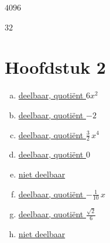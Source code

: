 \documentclass{ximera}
\begin{document}
\begin{Antwoord} \label{antw1.17}
\hyperlink{oef1.17}{$4096$}
\end{Antwoord}

\begin{Antwoord} \label{antw1.18}
\hyperlink{oef1.18}{$32$}
\setcounter{enumi}{0}
\end{Antwoord}

\clearpage

\section*{Hoofdstuk 2}

\begin{Antwoord} \label{antw2.1}
\begin{enumerate}[(a)]
\item
\hyperlink{oef2.1}{deelbaar, quoti\"ent $6x^2$} 
\item
\hyperlink{oef2.1}{deelbaar, quoti\"ent $-2$}
\item
\hyperlink{oef2.1}{deelbaar, quoti\"ent $\frac{3}{2}\,x^4$}
\item
\hyperlink{oef2.1}{deelbaar, quoti\"ent $0$}
\item
\hyperlink{oef2.1}{niet deelbaar}
\item
\hyperlink{oef2.1}{deelbaar, quoti\"ent $-\frac{1}{10}\,x$}
\item
\hyperlink{oef2.1}{deelbaar, quoti\"ent $\frac{\sqrt{2}}{6}$}
\item
\hyperlink{oef2.1}{niet deelbaar}
\end{enumerate}
\end{Antwoord}
\end{document}

